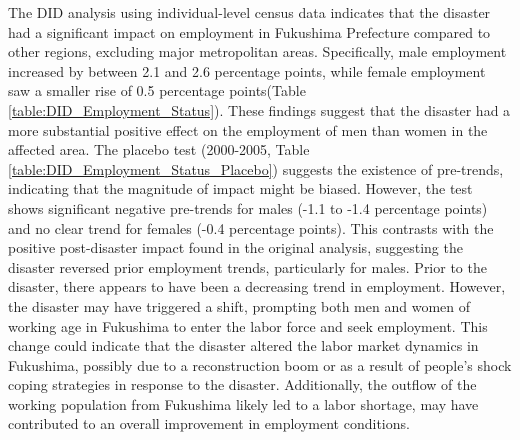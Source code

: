 \documentclass[a4paper,12pt]{article}
\begin{document}
The DID analysis using individual-level census data indicates that the disaster had a significant impact on employment in Fukushima Prefecture compared to other regions, excluding major metropolitan areas. Specifically, male employment increased by between 2.1 and 2.6 percentage points, while female employment saw a smaller rise of 0.5 percentage points(Table \ref{table:DID_Employment_Status}). These findings suggest that the disaster had a more substantial positive effect on the employment of men than women in the affected area. The placebo test (2000-2005, Table \ref{table:DID_Employment_Status_Placebo}) suggests the existence of pre-trends, indicating that the magnitude of impact might be biased. However, the test shows significant negative pre-trends for males (-1.1 to -1.4 percentage points) and no clear trend for females (-0.4 percentage points). This contrasts with the positive post-disaster impact found in the original analysis, suggesting the disaster reversed prior employment trends, particularly for males. Prior to the disaster, there appears to have been a decreasing trend in employment. However, the disaster may have triggered a shift, prompting both men and women of working age in Fukushima to enter the labor force and seek employment. This change could indicate that the disaster altered the labor market dynamics in Fukushima, possibly due to a reconstruction boom or as a result of people's shock coping strategies in response to the disaster. Additionally, the outflow of the working population from Fukushima likely led to a labor shortage, may have contributed to an overall improvement in employment conditions.
\end{document}
